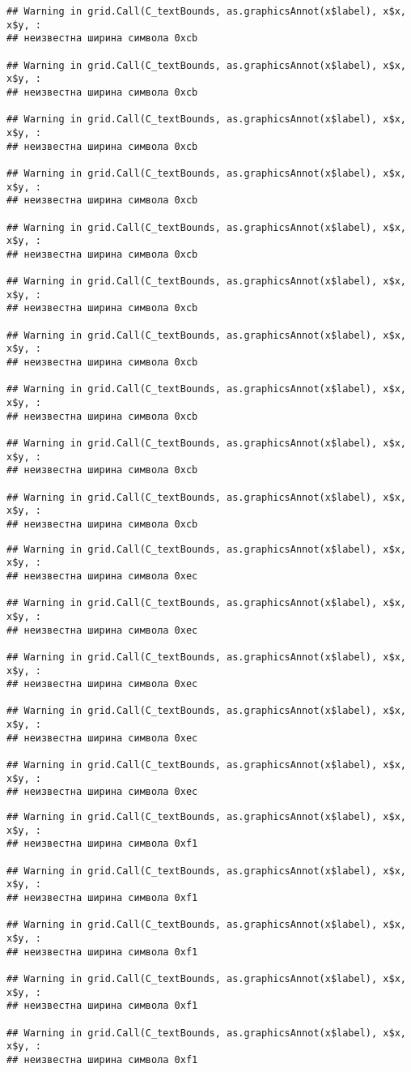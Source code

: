 \documentclass[
]{article}
\begin{document}
\begin{verbatim}
## Warning in grid.Call(C_textBounds, as.graphicsAnnot(x$label), x$x, x$y, :
## неизвестна ширина символа 0xcb

## Warning in grid.Call(C_textBounds, as.graphicsAnnot(x$label), x$x, x$y, :
## неизвестна ширина символа 0xcb

## Warning in grid.Call(C_textBounds, as.graphicsAnnot(x$label), x$x, x$y, :
## неизвестна ширина символа 0xcb

## Warning in grid.Call(C_textBounds, as.graphicsAnnot(x$label), x$x, x$y, :
## неизвестна ширина символа 0xcb

## Warning in grid.Call(C_textBounds, as.graphicsAnnot(x$label), x$x, x$y, :
## неизвестна ширина символа 0xcb

## Warning in grid.Call(C_textBounds, as.graphicsAnnot(x$label), x$x, x$y, :
## неизвестна ширина символа 0xcb

## Warning in grid.Call(C_textBounds, as.graphicsAnnot(x$label), x$x, x$y, :
## неизвестна ширина символа 0xcb

## Warning in grid.Call(C_textBounds, as.graphicsAnnot(x$label), x$x, x$y, :
## неизвестна ширина символа 0xcb

## Warning in grid.Call(C_textBounds, as.graphicsAnnot(x$label), x$x, x$y, :
## неизвестна ширина символа 0xcb

## Warning in grid.Call(C_textBounds, as.graphicsAnnot(x$label), x$x, x$y, :
## неизвестна ширина символа 0xcb
\end{verbatim}

\begin{verbatim}
## Warning in grid.Call(C_textBounds, as.graphicsAnnot(x$label), x$x, x$y, :
## неизвестна ширина символа 0xec

## Warning in grid.Call(C_textBounds, as.graphicsAnnot(x$label), x$x, x$y, :
## неизвестна ширина символа 0xec

## Warning in grid.Call(C_textBounds, as.graphicsAnnot(x$label), x$x, x$y, :
## неизвестна ширина символа 0xec

## Warning in grid.Call(C_textBounds, as.graphicsAnnot(x$label), x$x, x$y, :
## неизвестна ширина символа 0xec

## Warning in grid.Call(C_textBounds, as.graphicsAnnot(x$label), x$x, x$y, :
## неизвестна ширина символа 0xec
\end{verbatim}

\begin{verbatim}
## Warning in grid.Call(C_textBounds, as.graphicsAnnot(x$label), x$x, x$y, :
## неизвестна ширина символа 0xf1

## Warning in grid.Call(C_textBounds, as.graphicsAnnot(x$label), x$x, x$y, :
## неизвестна ширина символа 0xf1

## Warning in grid.Call(C_textBounds, as.graphicsAnnot(x$label), x$x, x$y, :
## неизвестна ширина символа 0xf1

## Warning in grid.Call(C_textBounds, as.graphicsAnnot(x$label), x$x, x$y, :
## неизвестна ширина символа 0xf1

## Warning in grid.Call(C_textBounds, as.graphicsAnnot(x$label), x$x, x$y, :
## неизвестна ширина символа 0xf1
\end{verbatim}
\end{document}
